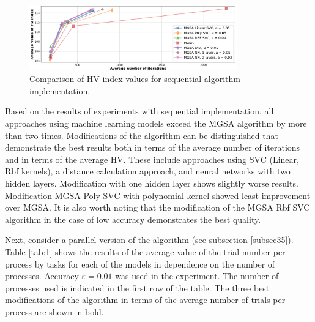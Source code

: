 \documentclass[runningheads]{llncs}
\begin{document}
\begin{figure}
\center
\includegraphics[width=0.8\textwidth]{fig5.png}
\caption{Comparison of HV index values for sequential algorithm implementation.} \label{fig5}
\end{figure}

Based on the results of experiments with sequential implementation, all approaches using machine learning models exceed the MGSA algorithm by more than two times. Modifications of the algorithm can be distinguished that demonstrate the best results both in terms of the average number of iterations and in terms of the average HV. These include approaches using SVC (Linear, Rbf kernels), a distance calculation approach, and neural networks with two hidden layers. Modification with one hidden layer shows slightly worse results. Modification  MGSA Poly SVC with polynomial kernel showed least improvement over MGSA. It is also worth noting that the modification of the MGSA Rbf SVC algorithm in the case of low accuracy demonstrates the best quality.

Next, consider a parallel version of the algorithm (see subsection \ref{subsec35}). Table \ref{tab:1} shows the results of the average value of the trial number per process by tasks for each of the models in dependence on the number of processes. Accuracy $\varepsilon=0.01$ was used in the experiment. The number of processes used is indicated in the first row of the table. The three best modifications of the algorithm in terms of the average number of trials per process are shown in bold.
\end{document}
